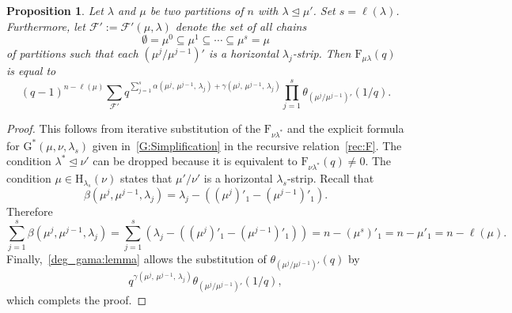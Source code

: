 \documentclass[12pt,a4paper,reqno]{amsart}
\theoremstyle{plain}
\newtheorem{proposition}[theorem]{Proposition}
\theoremstyle{definition}
\newcommand{\less}{\unlhd}
\newcommand{\1}{\mathds{1}}
\newcommand{\G}{{\mathrm{G}}}
\newcommand{\F}{\mathrm{F}}
\newcommand{\HH}{\mathrm{H}}
\begin{document}
\begin{proposition}
\label{F_simpler:Corr}
\label{F_chain:prop} Let $\lambda$ and $\mu$ be two partitions of $n$ with $\lambda\less\mu'$. Set $s=\ell(\lambda)$. Furthermore, let $\mathcal{F'}:=\mathcal{F'}(\mu,\lambda)$ denote the set of all chains  \[
\emptyset=\mu^{0}\subseteq \mu^{1}\subseteq \cdots\subseteq \mu^{s}=\mu\] of partitions such that each $(\mu^{j}/\mu^{j-1})'$ is a horizontal $\lambda_j$-strip. Then $\F_{\mu\lambda}(q)$ is equal to
\begin{equation}\label{Fmula:comb2}
(q-1)^{n-\ell(\mu)}\sum_{\mathcal{F'}} q^{
\sum_{j=1}^s\alpha(\mu^j,\,\mu^{j-1},\,\lambda_j)
+
\gamma(\mu^j,\,\mu^{j-1},\,\lambda_j)
}\prod_{j=1}^s\theta_{(\mu^j/\mu^{j-1})'}(1/q).
\end{equation}
\end{proposition}
\begin{proof}
This follows from iterative substitution of the $\F_{\nu\lambda^*}$ and the explicit formula for $\G^*(\mu,\nu,\lambda_s)$ given in~\cref{G:Simplification}
in the recursive relation~\cref{rec:F}. The condition $\lambda^*\less\nu'$ can be dropped because it is equivalent to  $\F_{\nu\lambda^*}(q)\neq 0$. The condition $\mu\in\HH_{\lambda_s}(\nu)$ states that $\mu'/\nu'$ is a horizontal $\lambda_s$-strip. 
Recall that $$\beta(\mu^j,\mu^{j-1},\lambda_j)=\lambda_j-\left(\left(\mu^j\right)'_1-\left(\mu^{j-1}\right)'_1\right).$$
Therefore
$$
\sum_{j=1}^s\beta(\mu^j,\mu^{j-1},\lambda_j)=\sum_{j=1}^s \left(\lambda_j-\left(\left(\mu^j\right)'_1-\left(\mu^{j-1}\right)'_1\right)\right)=n-\left(\mu^{s}\right)'_1=n-\mu'_1=n-\ell(\mu). 
$$
Finally,~\cref{deg_gama:lemma} allows the substitution of $\theta_{(\mu^j/\mu^{j-1})'}(q)$ by
\[
q^{\gamma(\mu^j,\,\mu^{j-1},\,\lambda_j)}\theta_{(\mu^j/\mu^{j-1})'}(1/q),
\] which complets the proof.
\end{proof}
\end{document}

